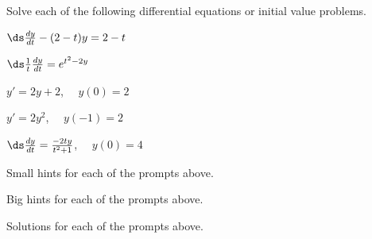 \begin{activity} \label{A:7.4.3}  Solve each of the following differential equations or initial value problems.
\ba
	\item $\ds \frac{dy}{dt} - (2-t) y = 2-t$
	\item $\ds \frac{1}{t}\frac{dy}{dt} = e^{t^2-2y}$
	\item $y' = 2y+2$, \ \ $y(0)=2$
	\item $y' = 2y^2$, \ \ $y(-1) = 2$
	\item $\ds \frac{dy}{dt} = \frac{-2ty}{t^2 + 1}$, \ \  $y(0) = 4$
\ea
\end{activity}
\begin{smallhint}
\ba
	\item Small hints for each of the prompts above.
\ea
\end{smallhint}
\begin{bighint}
\ba
	\item Big hints for each of the prompts above.
\ea
\end{bighint}
\begin{activitySolution}
\ba
	\item Solutions for each of the prompts above.
\ea
\end{activitySolution}
\aftera
